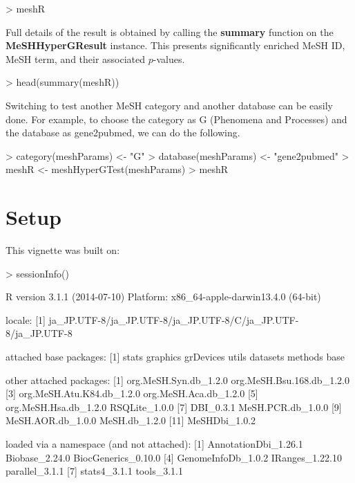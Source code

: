 \documentclass[11pt]{article}
\begin{document}
\begin{center}
\begin{Schunk}
\begin{Sinput}
> meshR
\end{Sinput}
\end{Schunk}
\end{center}

Full details of the result is obtained by calling the \textbf{summary} function on the \textbf{MeSHHyperGResult} instance.
This presents significantly enriched MeSH ID, MeSH term, and their associated $p$-values.

\begin{center}
\begin{Schunk}
\begin{Sinput}
> head(summary(meshR))
\end{Sinput}
\end{Schunk}
\end{center}

Switching to test another MeSH category and another database can be easily done.
For example, to choose the category as G (Phenomena and Processes) and the database as gene2pubmed, we can do the following.

\begin{center}
\begin{Schunk}
\begin{Sinput}
> category(meshParams) <- "G"
> database(meshParams) <- "gene2pubmed"
> meshR <- meshHyperGTest(meshParams)
> meshR
\end{Sinput}
\end{Schunk}
\end{center}

\clearpage
\section{Setup}

This vignette was built on:
\begin{Schunk}
\begin{Sinput}
> sessionInfo()
\end{Sinput}
\begin{Soutput}
R version 3.1.1 (2014-07-10)
Platform: x86_64-apple-darwin13.4.0 (64-bit)

locale:
[1] ja_JP.UTF-8/ja_JP.UTF-8/ja_JP.UTF-8/C/ja_JP.UTF-8/ja_JP.UTF-8

attached base packages:
[1] stats     graphics  grDevices utils     datasets  methods   base     

other attached packages:
 [1] org.MeSH.Syn.db_1.2.0     org.MeSH.Bsu.168.db_1.2.0
 [3] org.MeSH.Atu.K84.db_1.2.0 org.MeSH.Aca.db_1.2.0    
 [5] org.MeSH.Hsa.db_1.2.0     RSQLite_1.0.0            
 [7] DBI_0.3.1                 MeSH.PCR.db_1.0.0        
 [9] MeSH.AOR.db_1.0.0         MeSH.db_1.2.0            
[11] MeSHDbi_1.0.2            

loaded via a namespace (and not attached):
[1] AnnotationDbi_1.26.1 Biobase_2.24.0       BiocGenerics_0.10.0 
[4] GenomeInfoDb_1.0.2   IRanges_1.22.10      parallel_3.1.1      
[7] stats4_3.1.1         tools_3.1.1         
\end{Soutput}
\end{Schunk}
\end{document}
